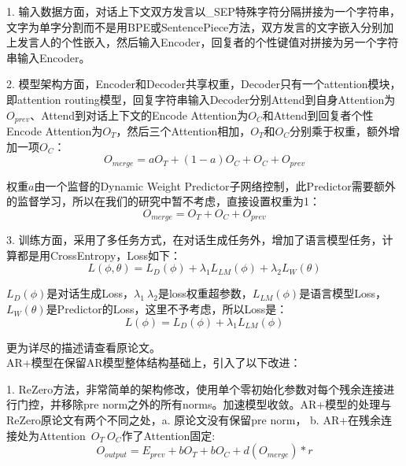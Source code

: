 \documentclass[letterpaper]{article} %
\DeclareRobustCommand{\citeext}[1]{\cite[#1]{#1}}
\begin{document}
\begin{CJK*}{UTF8}{gbsn}
1. 输入数据方面，对话上下文双方发言以\_SEP特殊字符分隔拼接为一个字符串，文字为单字分割而不是用BPE或SentencePiece方法，双方发言的文字嵌入分别加上发言人的个性嵌入，然后输入Encoder，回复者的个性键值对拼接为另一个字符串输入Encoder。

2. 模型架构方面，Encoder和Decoder共享权重，Decoder只有一个attention模块，即attention routing模型，回复字符串输入Decoder分别Attend到自身Attention为\\$O_{prev}$、Attend到对话上下文的Encode Attention为$O_C$和Attend到回复者个性Encode Attention为$O_T$，然后三个Attention相加，$O_T$和$O_C$分别乘于权重，额外增加一项$O_C$：
\begin{equation}
O_{merge} = aO_T + (1 - a)O_C + O_C + O_{prev}    
\end{equation}

权重$a$由一个监督的Dynamic Weight Predictor子网络控制，此Predictor需要额外的监督学习，所以在我们的研究中暂不考虑，直接设置权重为1：
\begin{equation}
O_{merge} = O_T + O_C + O_{prev}    
\end{equation}

3. 训练方面，采用了多任务方式，在对话生成任务外，增加了语言模型任务，计算都是用CrossEntropy，Loss如下：
\begin{equation}
L(\phi, \theta) = L_D(\phi) + \lambda_1L_{LM}(\phi) + \lambda_2L_W(\theta)
\end{equation}

$L_D(\phi)$是对话生成Loss，$\lambda_1~\lambda_2$是loss权重超参数，$L_{LM}(\phi)$是语言模型Loss，\\$L_W(\theta)$是Predictor的Loss，这里不予考虑，所以Loss是：
\begin{equation}
L(\phi) = L_D(\phi) + \lambda_1L_{LM}(\phi)
\end{equation}

更为详尽的描述请查看原论文\citeext{Zheng2019}。\\

AR+模型在保留AR模型整体结构基础上，引入了以下改进：

1. ReZero\citeext{Bachlechner2020}方法，非常简单的架构修改，使用单个零初始化参数对每个残余连接进行门控，并移除pre norm之外的所有norms。加速模型收敛。AR+模型的处理与ReZero原论文有两个不同之处，a. 原论文没有保留pre norm， b. AR+在残余连接处为Attention~$O_T~O_C$作了Attention固定:
\begin{equation}
O_{output} = E_{prev} + bO_T + bO_C + d(O_{merge}) * r
\end{equation}


\end{CJK*}
\end{document}
